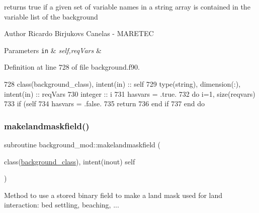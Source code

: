 returns true if a given set of variable names in a string array is contained in the variable list of the background 

\begin{DoxyAuthor}{Author}
Ricardo Birjukovs Canelas -\/ M\+A\+R\+E\+T\+EC 
\end{DoxyAuthor}

\begin{DoxyParams}[1]{Parameters}
\mbox{\tt in}  & {\em self,req\+Vars} & \\
\hline
\end{DoxyParams}


Definition at line 728 of file background.\+f90.


\begin{DoxyCode}
728     \textcolor{keywordtype}{class}(background\_class), \textcolor{keywordtype}{intent(in)} :: self
729     \textcolor{keywordtype}{type}(string), \textcolor{keywordtype}{dimension(:)}, \textcolor{keywordtype}{intent(in)} :: reqVars
730     \textcolor{keywordtype}{integer} :: i
731     hasvars = .true.
732     \textcolor{keywordflow}{do} i=1, \textcolor{keyword}{size}(reqvars)
733         \textcolor{keywordflow}{if} (self%
734             hasvars = .false.
735             \textcolor{keywordflow}{return}
736 \textcolor{keywordflow}{        end if}
737 \textcolor{keywordflow}{    end do}
\end{DoxyCode}
\mbox{\label{namespacebackground__mod_a26fbde130644e684871804b73de8d51b}} 
\subsubsection{\texorpdfstring{makelandmaskfield()}{makelandmaskfield()}}
{\footnotesize\ttfamily subroutine background\+\_\+mod\+::makelandmaskfield (\begin{DoxyParamCaption}\item[{class(\mbox{\hyperlink{structbackground__mod_1_1background__class}{background\+\_\+class}}), intent(inout)}]{self }\end{DoxyParamCaption})\hspace{0.3cm}{\ttfamily [private]}}



Method to use a stored binary field to make a land mask used for land interaction\+: bed settling, beaching, ... 

